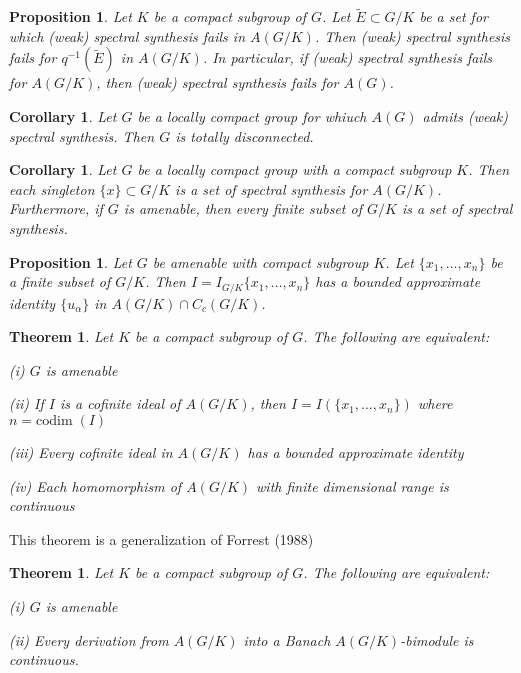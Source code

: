 \documentclass[landscape]{slides}
\newtheorem{theorem}[defn]{Theorem}
\newtheorem{prop}[defn]{Proposition}
\newtheorem{cor}[defn]{Corollary}
\begin{document}
\begin{slide}
\begin{prop}
Let $K$ be a compact subgroup of $G$.  Let $\tilde{E} \subset G/K$ be a set for which (weak)
spectral synthesis fails in $A(G/K)$.  Then (weak) spectral synthesis fails for $q^{-1}(\tilde{E})$
in $A(G/K)$.  In particular, if (weak) spectral synthesis fails for $A(G/K)$, then (weak)
spectral synthesis fails for $A(G)$.
\end{prop}

\begin{cor}
Let $G$ be a locally compact group for whiuch $A(G)$ admits (weak) spectral synthesis.
Then $G$ is totally disconnected.
\end{cor}

\begin{cor}
Let $G$ be a locally compact group with a compact subgroup $K$.  Then each singleton $\{x\}
\subset G/K$ is a set of spectral synthesis for $A(G/K)$.  Furthermore, if $G$ is amenable,
then every finite subset of $G/K$ is a set of spectral synthesis.
\end{cor}
\end{slide}

\begin{slide}
\begin{prop}
Let $G$ be amenable with compact subgroup $K$.  Let $\{x_1 ,\ldots ,x_n\}$ be a finite
subset of $G/K$.  Then $I = I_{G/K} \{x_1 ,\ldots ,x_n\}$ has a bounded approximate
identity $\{u_\alpha\}$ in $A(G/K) \cap C_c (G/K)$.
\end{prop}

\begin{theorem}
Let $K$ be a compact subgroup of $G$.  The following are equivalent:
\begin{list}{}{\topsep -4pt \itemsep -4pt}
\item[(i)] $G$ is amenable
\item[(ii)] If $I$ is a cofinite ideal of $A(G/K)$, then $I=I(\{x_1 ,\ldots ,x_n\})$ where $n=\text{codim}\;(I)$
\item[(iii)] Every cofinite ideal in $A(G/K)$ has a bounded approximate identity
\item[(iv)] Each homomorphism of $A(G/K)$ with finite dimensional range is continuous
\end{list}
\end{theorem}
\end{slide}

\begin{slide}
This theorem is a generalization of Forrest (1988)
\begin{theorem}
Let $K$ be a compact subgroup of $G$.  The following are equivalent:
\begin{list}{}{\topsep -4pt \itemsep -4pt}
\item[(i)] $G$ is amenable
\item[(ii)] Every derivation from $A(G/K)$ into a Banach $A(G/K)$-bimodule is continuous.
\end{list}
\end{theorem}
\end{slide}
\end{document}
